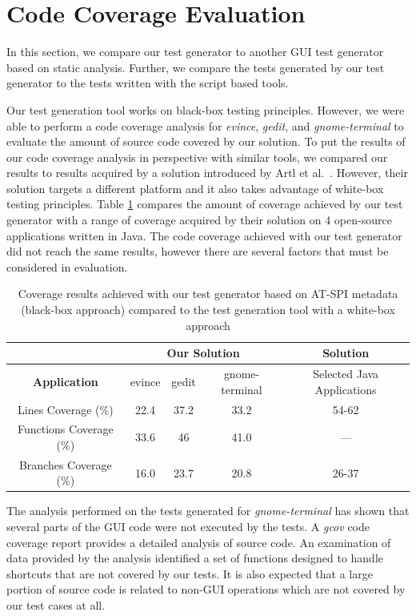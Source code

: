 \section{Code Coverage Evaluation}\label{code_coverage_evaluation}
In this section, we compare our test generator to another GUI test generator based on static analysis. Further, we compare the tests generated by our test generator to the tests written with the script based tools. 

Our test generation tool works on black-box testing principles. However, we were able to perform a code coverage analysis for \textit{evince}, \textit{gedit}, and \textit{gnome-terminal} to evaluate the amount of source code covered by our solution.  To put the results of our code coverage analysis in perspective with similar tools, we compared our results to results acquired by a solution introduced by Artl et al.~\cite{ArltS2012LSAf}. However, their solution targets a different platform and it also takes advantage of white-box testing principles.
Table \ref{table} compares the amount of coverage achieved by our test generator with a range of coverage acquired by their solution on 4 open-source applications written in Java. The code coverage achieved with our test generator did not reach the same results, however there are several factors that must be considered in evaluation. 

\begin{table}[htb!]
\centering
\label{table}
\begin{tabular}{|c||c|c|c|c|}
\hline
 & \multicolumn{3}{c|}{\textbf{Our Solution}} & \textbf{Solution}\cite{ArltS2012LSAf} \\
\hline
\textbf{Application} &  evince & gedit & gnome-terminal & Selected Java Applications   \\
\hline
\hline
Lines Coverage (\%) & 22.4  & 37.2  & 33.2   & 54-62    \\
\hline
Functions Coverage (\%) & 33.6 & 46 & 41.0  &  --- \\
\hline
Branches Coverage (\%) & 16.0 & 23.7 & 20.8 & 26-37  \\
\hline
\end{tabular}
\caption{Coverage results achieved with our test generator based on AT-SPI metadata (black-box approach) compared to the test generation tool\cite{ArltS2012LSAf} with a white-box approach}
\end{table}

The analysis performed on the tests generated for \textit{gnome-terminal} has shown that several parts of the GUI code were not executed by the tests. A \textit{gcov} code coverage report provides a detailed analysis of source code. An examination of data provided by the analysis identified a set of functions designed to handle shortcuts that are not covered by our tests. It is also expected that a large portion of source code is related to non-GUI operations which are not covered by our test cases at all.

